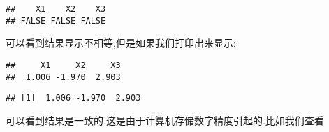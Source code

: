 \documentclass[]{ctexbook}
\newenvironment{Shaded}{\begin{snugshade}}{\end{snugshade}}
\newcommand{\DataTypeTok}[1]{\textcolor[rgb]{0.13,0.29,0.53}{#1}}
\newcommand{\DecValTok}[1]{\textcolor[rgb]{0.00,0.00,0.81}{#1}}
\newcommand{\KeywordTok}[1]{\textcolor[rgb]{0.13,0.29,0.53}{\textbf{#1}}}
\newcommand{\NormalTok}[1]{#1}
\newcommand{\OperatorTok}[1]{\textcolor[rgb]{0.81,0.36,0.00}{\textbf{#1}}}
\begin{document}
\begin{verbatim}
##    X1    X2    X3 
## FALSE FALSE FALSE
\end{verbatim}

可以看到结果显示不相等,但是如果我们打印出来显示:

\begin{Shaded}
\end{Shaded}

\begin{verbatim}
##     X1     X2     X3 
##  1.006 -1.970  2.903
\end{verbatim}

\begin{Shaded}
\end{Shaded}

\begin{verbatim}
## [1]  1.006 -1.970  2.903
\end{verbatim}

可以看到结果是一致的.这是由于计算机存储数字精度引起的.比如我们查看

\begin{Shaded}
\end{Shaded}
\end{document}
